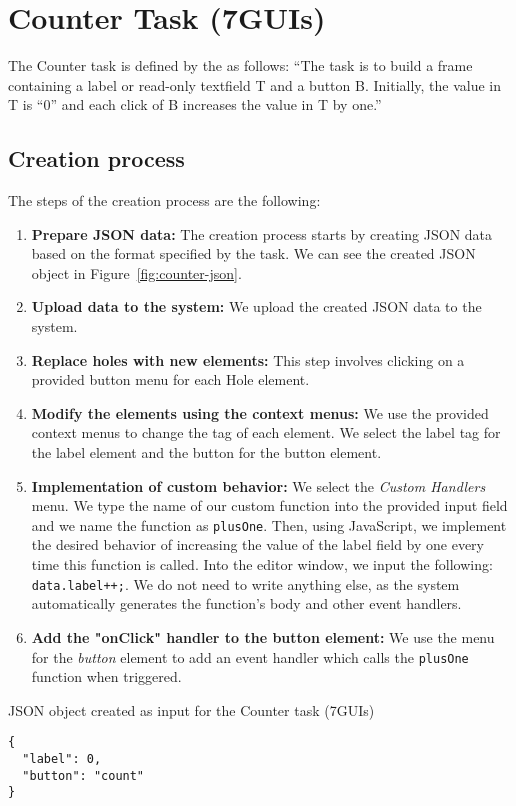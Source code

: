 \section{Counter Task (7GUIs)}
The Counter task is defined by the \citet{7GUIs-web} as follows: ``The task is to build a frame containing a label or read-only textfield T and a button B. Initially, the value in T is “0” and each click of B increases the value in T by one.''

\subsection {Creation process}

The steps of the creation process are the following:
\begin{enumerate}
	\item \textbf{Prepare JSON data:} The creation process starts by creating JSON data based on the format specified by the task.
	      We can see the created JSON object in Figure~\ref{fig:counter-json}.
	\item \textbf{Upload data to the system:} We upload the created JSON data to the system.
	\item \textbf{Replace holes with new elements:} This step involves clicking on a provided button menu for each Hole element.
	\item \textbf{Modify the elements using the context menus:} We use the provided context menus to change the tag of each element.
	      We select the label tag for the label element and the button for the button element.
	\item \textbf{Implementation of custom behavior:} We select the \emph{Custom Handlers} menu.
	      We type the name of our custom function into the provided input field and
	      we name the function as \texttt{plusOne}.
	      Then, using JavaScript, we implement the desired behavior of increasing the value of the label field by one
	      every time this function is called.
	      Into the editor window, we input the following: \texttt{data.label++;}.
	      We do not need to write anything else, as the system automatically generates the function's body and other event handlers.
	\item \textbf{Add the "onClick" handler to the button element:} We use the menu for the \emph{button} element to add an event handler
	      which calls the \texttt{plusOne} function when triggered.
\end{enumerate}


\begin{listing}[htbp]
	\caption{JSON object created as input for the Counter task (7GUIs)}
	\label{fig:counter-json}
	\begin{lstlisting}
{
  "label": 0,
  "button": "count"
}
    \end{lstlisting}
\end{listing}

